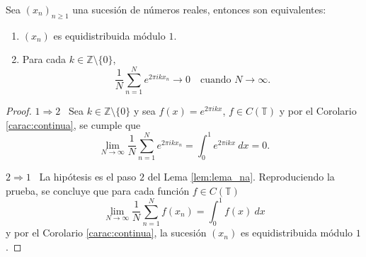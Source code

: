 \begin{theorem}
    \label{teo:criterio_weyl}
    Sea $(x_n)_{n\geq1}$ una sucesión de números reales, entonces son equivalentes:
    \begin{enumerate}
        \item $(x_n)$ es equidistribuida módulo $1$.
        \item Para cada $k \in \mathbb{Z} \setminus \{0\}$,
              \[
                  \frac{1}{N} \sum_{n=1}^N e^{2\pi i k x_n} \longrightarrow 0 \quad \text{cuando } N \to \infty.
              \]
    \end{enumerate}
\end{theorem}

\begin{proof}
    $1 \Longrightarrow 2$ \, Sea $k \in \mathbb{Z} \setminus \{0\}$ y sea $f(x)=e^{2\pi i k x}$, 
    $f \in C(\mathbb{T})$ y por el Corolario \ref{carac:continua}, se cumple que
    \[
        \lim_{N \to \infty} \frac{1}{N} \sum_{n=1}^N e^{2\pi i k x_n} = \int_0^1 e^{2\pi i k x}\ dx = 0.
    \]
    
    $2 \Longrightarrow 1$ \, La hipótesis es el paso $2$ del Lema \ref{lem:lema_na}. 
    Reproduciendo la prueba, se concluye que para cada función $f \in C(\mathbb{T})$
    \[
        \lim_{N \to \infty} \frac{1}{N} \sum_{n=1}^N f(x_n) = \int_0^1 f(x)\ dx
    \]
    y por el Corolario \ref{carac:continua}, la sucesión $(x_n)$ es equidistribuida módulo $1$.
\end{proof}


